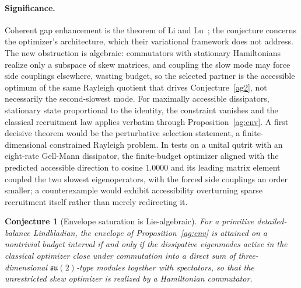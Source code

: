 \documentclass[11pt]{article}
\newtheorem{conjecture}{Conjecture}
\theoremstyle{definition}
\begin{document}
\paragraph{Significance.}
Coherent gap enhancement is the theorem of Li and Lu~\cite{LiLu24}; the conjecture concerns the optimizer's architecture, which their variational framework does not address.  The new obstruction is algebraic: commutators with stationary Hamiltonians realize only a subspace of skew matrices, and coupling the slow mode may force side couplings elsewhere, wasting budget, so the selected partner is the accessible optimum of the same Rayleigh quotient that drives Conjecture~\ref{ag2}, not necessarily the second-slowest mode.  For maximally accessible dissipators, stationary state proportional to the identity, the constraint vanishes and the classical recruitment law applies verbatim through Proposition~\ref{ag:env}.  A first decisive theorem would be the perturbative selection statement, a finite-dimensional constrained Rayleigh problem.  In tests on a unital qutrit with an eight-rate Gell-Mann dissipator, the finite-budget optimizer aligned with the predicted accessible direction to cosine $1.0000$ and its leading matrix element coupled the two slowest eigenoperators, with the forced side couplings an order smaller; a counterexample would exhibit accessibility overturning sparse recruitment itself rather than merely redirecting it.

\begin{conjecture}[Envelope saturation is Lie-algebraic]\label{ag8}
For a primitive detailed-balance Lindbladian, the envelope of Proposition~\ref{ag:env} is attained on a nontrivial budget interval if and only if the dissipative eigenmodes active in the classical optimizer close under commutation into a direct sum of three-dimensional $\mathfrak{su}(2)$-type modules together with spectators, so that the unrestricted skew optimizer is realized by a Hamiltonian commutator.
\end{conjecture}
\end{document}
